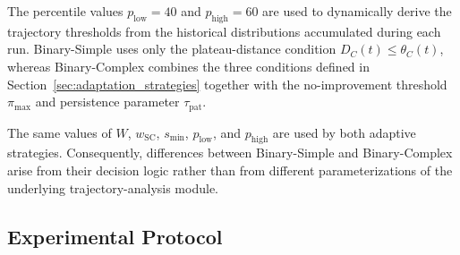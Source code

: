 \documentclass[journal,article,submit,moreauthors]{Definitions/mdpi}
\begin{document}
The percentile values $p_{\mathrm{low}}=40$ and
$p_{\mathrm{high}}=60$ are used to dynamically derive the trajectory
thresholds from the historical distributions accumulated during each run.
Binary-Simple uses only the plateau-distance condition
$D_C(t)\leq\theta_C(t)$, whereas Binary-Complex combines the three conditions
defined in Section~\ref{sec:adaptation_strategies} together with the
no-improvement threshold $\pi_{\max}$ and persistence parameter
$\tau_{\mathrm{pat}}$.

The same values of $W$, $w_{\mathrm{SC}}$, $s_{\min}$,
$p_{\mathrm{low}}$, and $p_{\mathrm{high}}$ are used by both adaptive
strategies. Consequently, differences between Binary-Simple and
Binary-Complex arise from their decision logic rather than from different
parameterizations of the underlying trajectory-analysis module.


\subsection{Experimental Protocol}
\label{sec:protocol}
\end{document}
